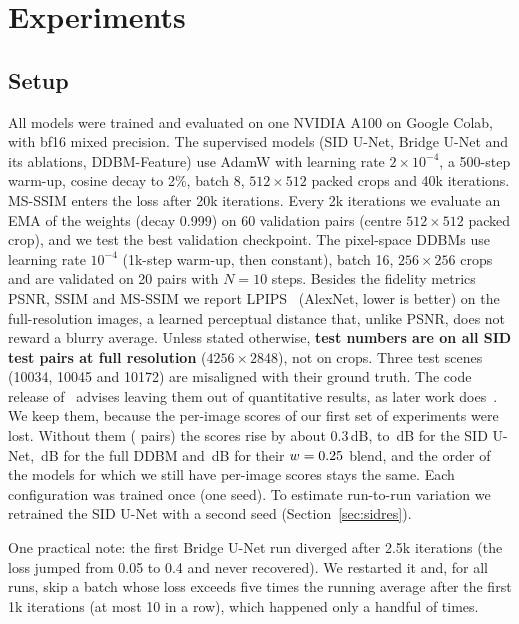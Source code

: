 \section{Experiments}
\label{sec:exp}

\subsection{Setup}
\label{sec:setup}
All models were trained and evaluated on one NVIDIA A100 on Google Colab, with bf16 mixed precision. The supervised models (SID U-Net, Bridge U-Net and its ablations, DDBM-Feature) use AdamW with learning rate $2\times10^{-4}$, a 500-step warm-up, cosine decay to 2\%, batch 8, $512\times512$ packed crops and 40k iterations. MS-SSIM enters the loss after 20k iterations. Every 2k iterations we evaluate an EMA of the weights (decay 0.999) on 60 validation pairs (centre $512\times512$ packed crop), and we test the best validation checkpoint. The pixel-space DDBMs use learning rate $10^{-4}$ (1k-step warm-up, then constant), batch 16, $256\times256$ crops and are validated on 20 pairs with $N=10$ steps. Besides the fidelity metrics PSNR, SSIM and MS-SSIM we report LPIPS~\cite{zhang2018lpips} (AlexNet, lower is better) on the full-resolution images, a learned perceptual distance that, unlike PSNR, does not reward a blurry average. Unless stated otherwise, \textbf{test numbers are on all \SIDTESTPAIRS{} SID test pairs at full resolution} ($4256\times2848$), not on crops. Three test scenes (10034, 10045 and 10172) are misaligned with their ground truth. The code release of~\cite{chen2018sid} advises leaving them out of quantitative results, as later work does~\cite{jin2023dnf}. We keep them, because the per-image scores of our first set of experiments were lost. Without them (\ALIGNEDPAIRS{} pairs) the scores rise by about 0.3\,dB, to \SIDALIGNEDPSNR\,dB for the SID U-Net, \VPALIGNEDPSNR\,dB for the full DDBM and \BLENDALIGNEDPSNR\,dB for their $w=0.25$ blend, and the order of the models for which we still have per-image scores stays the same. Each configuration was trained once (one seed). To estimate run-to-run variation we retrained the SID U-Net with a second seed (Section~\ref{sec:sidres}).

One practical note: the first Bridge U-Net run diverged after 2.5k iterations (the loss jumped from 0.05 to 0.4 and never recovered). We restarted it and, for all runs, skip a batch whose loss exceeds five times the running average after the first 1k iterations (at most 10 in a row), which happened only a handful of times.

